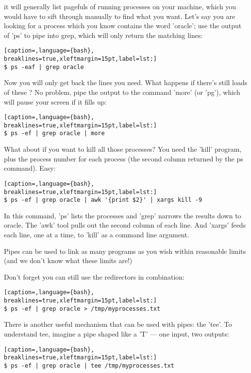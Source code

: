 it will generally list pagefuls of running processes on your machine, which you
would have to sift through manually to find what you want. Let's say you are
looking for a process which you know contains the word 'oracle'; use the output
of 'ps' to pipe into grep, which will only return the matching lines:
\lstset{basicstyle=\scriptsize, numbers=left, captionpos=b, tabsize=4}
\begin{lstlisting}[caption=,language={bash},
breaklines=true,xleftmargin=15pt,label=lst:]
$ ps -eaf | grep oracle
\end{lstlisting}

Now you will only get back the lines you need. What happens if there's still
loads of these ? No problem, pipe the output to the command 'more' (or 'pg'),
which will pause your screen if it fills up:
\lstset{basicstyle=\scriptsize, numbers=left, captionpos=b, tabsize=4}
\begin{lstlisting}[caption=,language={bash},
breaklines=true,xleftmargin=15pt,label=lst:]
$ ps -ef | grep oracle | more
\end{lstlisting}

What about if you want to kill all those processes? You need the 'kill'
program, plus the process number for each process (the second column returned
by the ps command). Easy:
\lstset{basicstyle=\scriptsize, numbers=left, captionpos=b, tabsize=4}
\begin{lstlisting}[caption=,language={bash},
breaklines=true,xleftmargin=15pt,label=lst:]
$ ps -ef | grep oracle | awk '{print $2}' | xargs kill -9
\end{lstlisting}

In this command, 'ps' lists the processes and 'grep' narrows the results down
to oracle. The 'awk' tool pulls out the second column of each line. And 'xargs'
feeds each line, one at a time, to 'kill' as a command line argument.

Pipes can be used to link as many programs as you wish within reasonable limits
(and we don't know what these limits are!)

Don't forget you can still use the redirectors in combination:
\lstset{basicstyle=\scriptsize, numbers=left, captionpos=b, tabsize=4}
\begin{lstlisting}[caption=,language={bash},
breaklines=true,xleftmargin=15pt,label=lst:]
$ ps -ef | grep oracle > /tmp/myprocesses.txt
\end{lstlisting}

There is another useful mechanism that can be used with pipes: the 'tee'. To
understand tee, imagine a pipe shaped like a 'T' --- one input, two outputs:
\lstset{basicstyle=\scriptsize, numbers=left, captionpos=b, tabsize=4}
\begin{lstlisting}[caption=,language={bash},
breaklines=true,xleftmargin=15pt,label=lst:]
$ ps -ef | grep oracle | tee /tmp/myprocesses.txt
\end{lstlisting}

